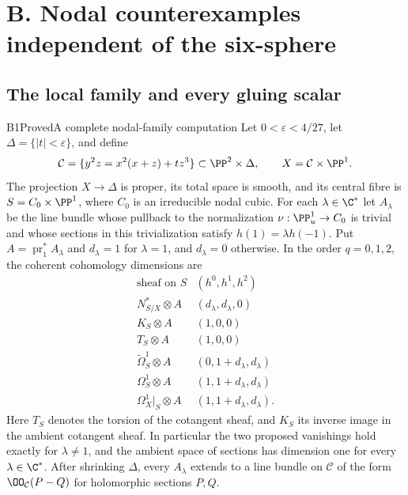 \section{B. Nodal counterexamples independent of the six-sphere}

\subsection{The local family and every gluing scalar}

\begin{statement}{B1}{Proved}{A complete nodal-family computation}
Let $0<\varepsilon<4/27$, let $\Delta=\{|t|<\varepsilon\}$, and define
\[
 \mathcal C=\{y^2z=x^2(x+z)+tz^3\}\subset\PP^2\times\Delta,
 \qquad X=\mathcal C\times\PP^1.
\]
The projection $X\to\Delta$ is proper, its total space is smooth, and its central fibre is $S=C_0\times\PP^1$, where $C_0$ is an irreducible nodal cubic. For each $\lambda\in\C^*$ let $A_\lambda$ be the line bundle whose pullback to the normalization $\nu:\PP^1_u\to C_0$ is trivial and whose sections in this trivialization satisfy $h(1)=\lambda h(-1)$. Put $A=\operatorname{pr}_1^*A_\lambda$ and $d_\lambda=1$ for $\lambda=1$, and $d_\lambda=0$ otherwise. In the order $q=0,1,2$, the coherent cohomology dimensions are
\[
\begin{array}{c|c}
\text{sheaf on }S & (h^0,h^1,h^2)\\\hline
 N^*_{S/X}\otimes A &(d_\lambda,d_\lambda,0)\\
 K_S\otimes A &(1,0,0)\\
 T_S\otimes A &(1,0,0)\\
 \widetilde\Omega^1_S\otimes A &(0,1+d_\lambda,d_\lambda)\\
 \Omega^1_S\otimes A &(1,1+d_\lambda,d_\lambda)\\
 \Omega^1_X|_S\otimes A &(1,1+d_\lambda,d_\lambda).
\end{array}                                                    \tag{B.1}
\]
Here $T_S$ denotes the torsion of the cotangent sheaf, and $K_S$ its inverse image in the ambient cotangent sheaf. In particular the two proposed vanishings hold exactly for $\lambda\ne1$, and the ambient space of sections has dimension one for every $\lambda\in\C^*$. After shrinking $\Delta$, every $A_\lambda$ extends to a line bundle on $\mathcal C$ of the form $\OO_{\mathcal C}(P-Q)$ for holomorphic sections $P,Q$.
\end{statement}

